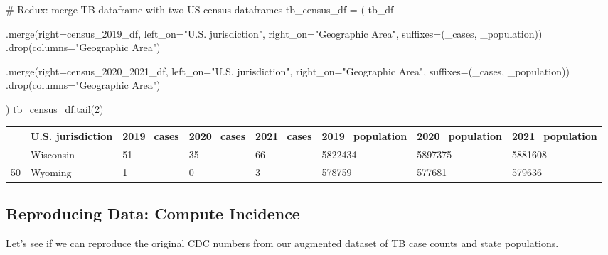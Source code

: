 \documentclass[
  letterpaper,
  DIV=11,
  numbers=noendperiod]{scrreprt}
\newenvironment{Shaded}{\begin{snugshade}}{\end{snugshade}}
\newcommand{\CommentTok}[1]{\textcolor[rgb]{0.37,0.37,0.37}{#1}}
\newcommand{\DecValTok}[1]{\textcolor[rgb]{0.68,0.00,0.00}{#1}}
\newcommand{\NormalTok}[1]{\textcolor[rgb]{0.00,0.23,0.31}{#1}}
\newcommand{\OperatorTok}[1]{\textcolor[rgb]{0.37,0.37,0.37}{#1}}
\newcommand{\StringTok}[1]{\textcolor[rgb]{0.13,0.47,0.30}{#1}}
\begin{document}
\begin{Shaded}
\begin{Highlighting}[]
\CommentTok{\# Redux: merge TB dataframe with two US census dataframes}
\NormalTok{tb\_census\_df }\OperatorTok{=}\NormalTok{ (}
\NormalTok{    tb\_df}
    
\NormalTok{    .merge(right}\OperatorTok{=}\NormalTok{census\_2019\_df,}
\NormalTok{           left\_on}\OperatorTok{=}\StringTok{"U.S. jurisdiction"}\NormalTok{, right\_on}\OperatorTok{=}\StringTok{"Geographic Area"}\NormalTok{,}
\NormalTok{           suffixes}\OperatorTok{=}\NormalTok{(}\StringTok{\textquotesingle{}\_cases\textquotesingle{}}\NormalTok{, }\StringTok{\textquotesingle{}\_population\textquotesingle{}}\NormalTok{))}
\NormalTok{    .drop(columns}\OperatorTok{=}\StringTok{"Geographic Area"}\NormalTok{)}

\NormalTok{    .merge(right}\OperatorTok{=}\NormalTok{census\_2020\_2021\_df,}
\NormalTok{           left\_on}\OperatorTok{=}\StringTok{"U.S. jurisdiction"}\NormalTok{, right\_on}\OperatorTok{=}\StringTok{"Geographic Area"}\NormalTok{,}
\NormalTok{           suffixes}\OperatorTok{=}\NormalTok{(}\StringTok{\textquotesingle{}\_cases\textquotesingle{}}\NormalTok{, }\StringTok{\textquotesingle{}\_population\textquotesingle{}}\NormalTok{))}
\NormalTok{    .drop(columns}\OperatorTok{=}\StringTok{"Geographic Area"}\NormalTok{)}
    
\NormalTok{)}
\NormalTok{tb\_census\_df.tail(}\DecValTok{2}\NormalTok{)}
\end{Highlighting}
\end{Shaded}

\begin{longtable}[]{@{}llllllll@{}}
\toprule\noalign{}
& U.S. jurisdiction & 2019\_cases & 2020\_cases & 2021\_cases &
2019\_population & 2020\_population & 2021\_population \\
\midrule\noalign{}
\endhead
\bottomrule\noalign{}
\endlastfoot
49 & Wisconsin & 51 & 35 & 66 & 5822434 & 5897375 & 5881608 \\
50 & Wyoming & 1 & 0 & 3 & 578759 & 577681 & 579636 \\
\end{longtable}

\subsection{Reproducing Data: Compute
Incidence}\label{reproducing-data-compute-incidence}

Let's see if we can reproduce the original CDC numbers from our
augmented dataset of TB case counts and state populations.
\end{document}
